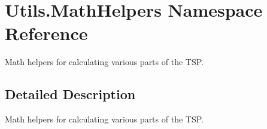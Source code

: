 \hypertarget{namespaceUtils_1_1MathHelpers}{}\section{Utils.\+Math\+Helpers Namespace Reference}
\label{namespaceUtils_1_1MathHelpers}


Math helpers for calculating various parts of the T\+SP.  




\subsection{Detailed Description}
Math helpers for calculating various parts of the T\+SP. 